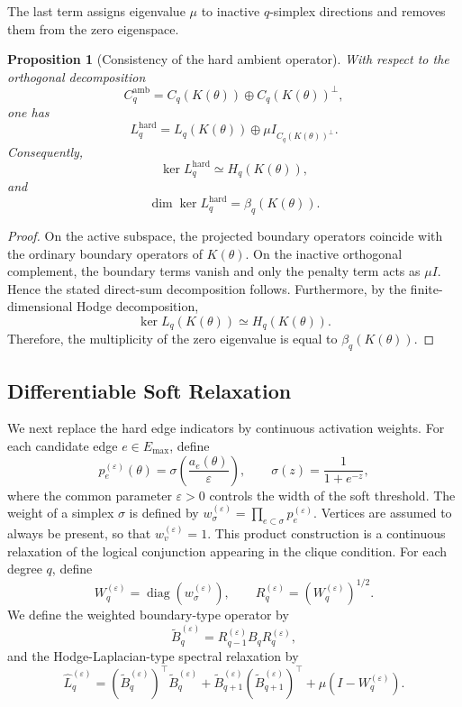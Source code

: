 \documentclass[pdflatex,sn-mathphys-num]{sn-jnl}%
\theoremstyle{thmstyleone}%
\newtheorem{proposition}[theorem]{Proposition}%
\theoremstyle{thmstyletwo}%
\theoremstyle{thmstylethree}%
\begin{document}
The last term assigns eigenvalue \(\mu\) to inactive \(q\)-simplex directions and removes them from the zero eigenspace.

\begin{proposition}[Consistency of the hard ambient operator]
With respect to the orthogonal decomposition
\[
C_q^{\mathrm{amb}}
=
C_q(K(\theta))
\oplus
C_q(K(\theta))^\perp,
\]
one has
\[
L_q^{\mathrm{hard}}
=
L_q(K(\theta))
\oplus
\mu I_{C_q(K(\theta))^\perp}.
\]
Consequently,
\[
\ker L_q^{\mathrm{hard}}
\simeq
H_q(K(\theta)),
\]
and
\[
\dim\ker L_q^{\mathrm{hard}}
=
\beta_q(K(\theta)).
\]
\end{proposition}

\begin{proof}
On the active subspace, the projected boundary operators coincide with the ordinary boundary operators of \(K(\theta)\). On the inactive orthogonal complement, the boundary terms vanish and only the penalty term acts as \(\mu I\). Hence the stated direct-sum decomposition follows.
Furthermore, by the finite-dimensional Hodge decomposition,
\[
\ker L_q(K(\theta))
\simeq
H_q(K(\theta)).
\]
Therefore, the multiplicity of the zero eigenvalue is equal to \(\beta_q(K(\theta))\).
\end{proof}





\subsection{Differentiable Soft Relaxation}

We next replace the hard edge indicators by continuous activation weights.
For each candidate edge \(e\in E_{\max}\), define
\[
p_e^{(\varepsilon)}(\theta)
=
\sigma\left(
\frac{a_e(\theta)}{\varepsilon}
\right),
\qquad
\sigma(z)=\frac{1}{1+e^{-z}},
\]
where the common parameter \(\varepsilon>0\) controls the width of the soft threshold.
The weight of a simplex \(\sigma\) is defined by
$w_\sigma^{(\varepsilon)}
=
\prod_{e\subset\sigma}
p_e^{(\varepsilon)}$.
Vertices are assumed to always be present, so that $w_v^{(\varepsilon)}=1$.
This product construction is a continuous relaxation of the logical conjunction appearing in the clique condition.
For each degree \(q\), define
\[
W_q^{(\varepsilon)}
=
\operatorname{diag}
\left(
w_\sigma^{(\varepsilon)}
\right),
\qquad
R_q^{(\varepsilon)}
=
\left(W_q^{(\varepsilon)}\right)^{1/2}.
\]
We define the weighted boundary-type operator by
\[
\widetilde B_q^{(\varepsilon)}
=
R_{q-1}^{(\varepsilon)}
B_q
R_q^{(\varepsilon)},
\]
and the Hodge-Laplacian-type spectral relaxation by
\[
\widehat L_q^{(\varepsilon)}
=
(\widetilde B_q^{(\varepsilon)})^\top
\widetilde B_q^{(\varepsilon)}
+
\widetilde B_{q+1}^{(\varepsilon)}
(\widetilde B_{q+1}^{(\varepsilon)})^\top
+
\mu
\left(
I-W_q^{(\varepsilon)}
\right).
\]
\end{document}
